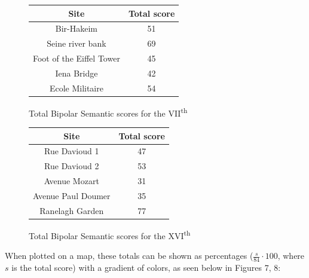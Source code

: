 \documentclass[11pt,letterpaper]{article}
\begin{document}
\begin{figure}[H]
    \begin{center}
        \begin{tabular}{||c c||}
            \hline
            Site                     & Total score \\ [0.5ex]
            \hline\hline
            Bir-Hakeim               & 51          \\
            \hline
            Seine river bank         & 69          \\
            \hline
            Foot of the Eiffel Tower & 45          \\
            \hline
            Iena Bridge              & 42          \\
            \hline
            Ecole Militaire          & 54          \\ [1ex]
            \hline
        \end{tabular}
    \end{center}
    \caption{Total Bipolar Semantic scores for the VII\textsuperscript{th}}
\end{figure}

\begin{figure}[H]
    \begin{center}
        \begin{tabular}{||c c||}
            \hline
            Site               & Total score \\ [0.5ex]
            \hline\hline
            Rue Davioud 1      & 47          \\
            \hline
            Rue Davioud 2      & 53          \\
            \hline
            Avenue Mozart      & 31          \\
            \hline
            Avenue Paul Doumer & 35          \\
            \hline
            Ranelagh Garden    & 77          \\ [1ex]
            \hline
        \end{tabular}
    \end{center}
    \caption{Total Bipolar Semantic scores for the XVI\textsuperscript{th}}
\end{figure}

When plotted on a map, these totals can be shown as percentages ($\frac{s}{84} \cdot 100$, where $s$ is the total score) with a gradient of colors, as seen below in Figures 7, 8:
\end{document}
